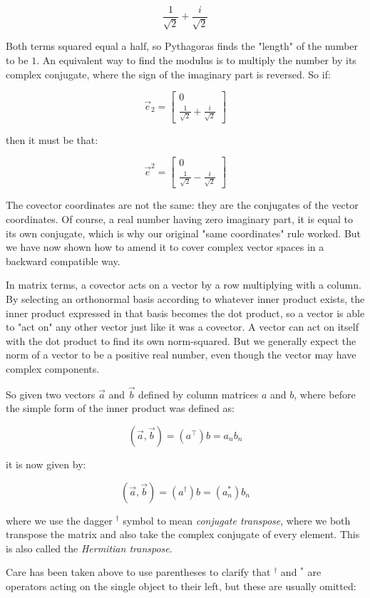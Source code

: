 $$
\frac{1}{\sqrt{2}} + \frac{i}{\sqrt{2}}
$$

Both terms squared equal a half, so Pythagoras finds the "length" of the number to be $1$. An equivalent way to find the modulus is to multiply the number by its complex conjugate, where the sign of the imaginary part is reversed. So if:

$$
\vec{e}_2 = \begin{bmatrix}0 \\ \frac{1}{\sqrt{2}} + \frac{i}{\sqrt{2}}\end{bmatrix}
$$

then it must be that:

$$
\vec{e}^2 = \begin{bmatrix}0 \\ \frac{1}{\sqrt{2}} - \frac{i}{\sqrt{2}}\end{bmatrix}
$$

The covector coordinates are not the same: they are the conjugates of the vector coordinates. Of course, a real number having zero imaginary part, it is equal to its own conjugate, which is why our original "same coordinates" rule worked. But we have now shown how to amend it to cover complex vector spaces in a backward compatible way.

In matrix terms, a covector acts on a vector by a row multiplying with a column. By selecting an orthonormal basis according to whatever inner product exists, the inner product expressed in that basis becomes the dot product, so a vector is able to "act on" any other vector just like it was a covector. A vector can act on itself with the dot product to find its own norm-squared. But we generally expect the norm of a vector to be a positive real number, even though the vector may have complex components.

So given two vectors $\vec{a}$ and $\vec{b}$ defined by column matrices $a$ and $b$, where before the simple form of the inner product was defined as:

$$
(\vec{a}, \vec{b}) = (a^\intercal) b = a_n b_n
$$

it is now given by:

$$
(\vec{a}, \vec{b}) = (a^\dagger) b = (a_n^*) b_n
$$

where we use the dagger $^\dagger$ symbol to mean \textit{conjugate transpose}, where we both transpose the matrix and also take the complex conjugate of every element. This is also called the \textit{Hermitian transpose}.

Care has been taken above to use parentheses to clarify that $^\dagger$ and $^*$ are operators acting on the single object to their left, but these are usually omitted:

